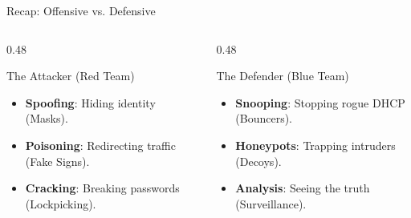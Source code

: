 \documentclass[aspectratio=169]{beamer}  %
\begin{document}
\begin{frame}{Recap: Offensive vs. Defensive}
    \begin{columns}[T]
        \begin{column}{0.48\textwidth}
            \begin{block}{The Attacker (Red Team)}
                \footnotesize
                \begin{itemize}
                    \item \textbf{Spoofing}: Hiding identity (Masks).
                    \item \textbf{Poisoning}: Redirecting traffic (Fake Signs).
                    \item \textbf{Cracking}: Breaking passwords (Lockpicking).
                \end{itemize}
            \end{block}
        \end{column}
        \begin{column}{0.48\textwidth}
            \begin{block}{The Defender (Blue Team)}
                \footnotesize
                \begin{itemize}
                    \item \textbf{Snooping}: Stopping rogue DHCP (Bouncers).
                    \item \textbf{Honeypots}: Trapping intruders (Decoys).
                    \item \textbf{Analysis}: Seeing the truth (Surveillance).
                \end{itemize}
            \end{block}
        \end{column}
    \end{columns}
    \vspace{0.5cm}
    \begin{center}
    \end{center}
\end{frame}
\end{document}
